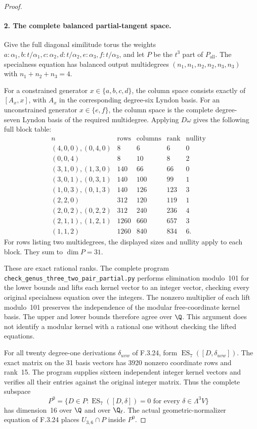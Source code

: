 \begin{proof}
\paragraph{2. The complete balanced partial-tangent space.}
Give the full diagonal similitude torus the weights
$a:\alpha_1,b:t/\alpha_1,c:\alpha_2,d:t/\alpha_2,
e:\alpha_3,f:t/\alpha_3$, and let $P$ be the
$t^3$ part of $P_{\mathrm{all}}$.
The specialness equation has balanced output
multidegrees $(n_1,n_1,n_2,n_2,n_3,n_3)$ with
$n_1+n_2+n_3=4$.

For a constrained generator $x\in\{a,b,c,d\}$,
the column space consists exactly of
$[A_x,x]$, with $A_x$ in the corresponding
degree-six Lyndon basis. For an unconstrained
generator $x\in\{e,f\}$, the column space
is the complete degree-seven Lyndon basis
of the required multidegree. Applying
$D\omega$ gives the following full block table:
\[
\begin{array}{c|r|r|r|r}
n&\text{rows}&\text{columns}&\text{rank}&\text{nullity}\\\hline
(4,0,0),(0,4,0)&8&6&6&0\\
(0,0,4)&8&10&8&2\\
(3,1,0),(1,3,0)&140&66&66&0\\
(3,0,1),(0,3,1)&140&100&99&1\\
(1,0,3),(0,1,3)&140&126&123&3\\
(2,2,0)&312&120&119&1\\
(2,0,2),(0,2,2)&312&240&236&4\\
(2,1,1),(1,2,1)&1260&660&657&3\\
(1,1,2)&1260&840&834&6.
\end{array}                                               \tag{PT.4}
\]
For rows listing two multidegrees, the displayed
sizes and nullity apply to each block. They sum
to $\dim P=31$.

These are exact rational ranks. The complete
program \texttt{check\_genus\_three\_two\_pair\_partial.py}
performs elimination modulo~101 for the lower
bounds and lifts each kernel vector to an
integer vector, checking every original
specialness equation over the integers.
The nonzero multiplier of each lift modulo~101
preserves the independence of the modular
free-coordinate kernel basis. The upper and
lower bounds therefore agree over $\Q$.
This argument does not identify a modular
kernel with a rational one without checking
the lifted equations.

For all twenty degree-one derivations
$\delta_{uvw}$ of F.3.24, form
$\operatorname{ES}_7([D,\delta_{uvw}])$.
The exact matrix on the 31 basis vectors has
3920 nonzero coordinate rows and rank~15.
The program supplies sixteen independent
integer kernel vectors and verifies all their
entries against the original integer matrix.
Thus the complete subspace
\[
 P^0=\{D\in P:\operatorname{ES}_7([D,\delta])=0
                      \text{ for every }\delta\in\Lambda^3V\}
\]
has dimension~16 over $\Q$ and over $\Q_\ell$.
The actual geometric-normalizer equation of
F.3.24 places $U_{3,6}\cap P$ inside $P^0$.


\end{proof}
